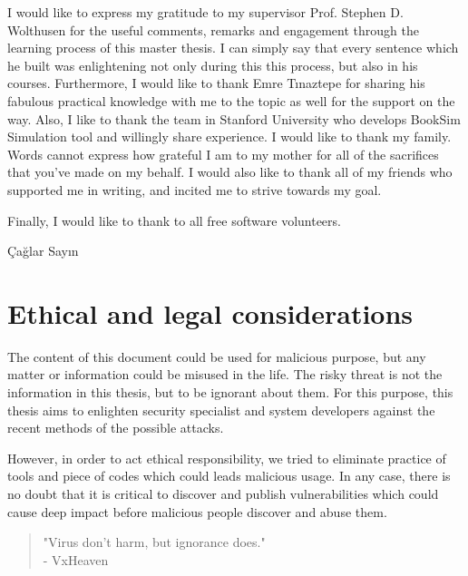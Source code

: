 \documentclass[medieteknikk]{gucmasterthesis}
\begin{document}
I would like to express my gratitude to my supervisor Prof. Stephen D. Wolthusen for the useful comments, remarks and engagement through the learning process of this master thesis. I can simply say that every sentence which he built was enlightening not only during this this process, but also in his courses. Furthermore, I would like to thank Emre Tınaztepe for sharing his fabulous practical knowledge with me to the topic as well for the support on the way. Also, I like to thank the team in Stanford University who develops BookSim Simulation tool and willingly share experience. I would like to thank my family.  Words cannot express how grateful I am to my mother for all of the sacrifices that you've made on my behalf. I would also like to thank all of my friends who supported me in writing, and incited me to strive towards my goal.

Finally, I would like to thank to all free software volunteers. 

\vspace{\baselineskip}
\noindent Çağlar Sayın \gucmasterthesisdate

\chapter*{Ethical and legal considerations}

The content of this document could be used for malicious purpose, but any matter or information could be misused in the life. The risky threat is not the information in this thesis, but to be ignorant about them. For this purpose, this thesis aims to enlighten security specialist and system developers against the recent methods of the possible attacks. 

However, in order to act ethical responsibility, we tried to eliminate practice of tools and piece of codes which could leads malicious usage. In any case, there is no doubt that it is critical to discover and publish vulnerabilities which could cause deep impact before malicious people discover and abuse them.

\begin{quote}

	"Virus don't harm, but ignorance does."\\
	- VxHeaven
\end{quote}

\tableofcontents
\listoffigures
\listoftables









\appendix


\end{document}
